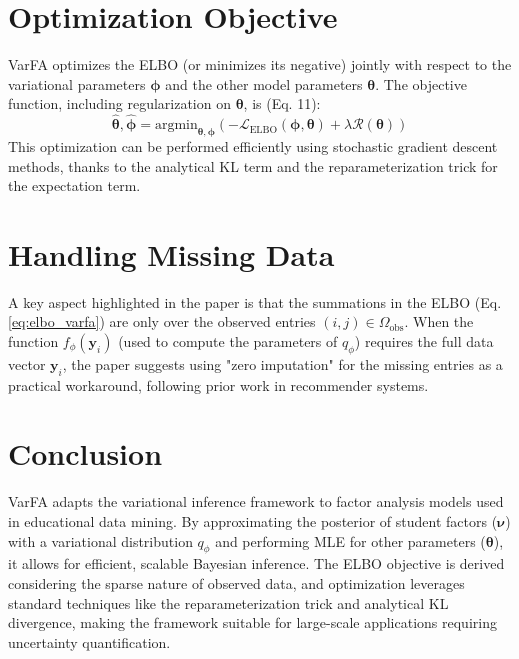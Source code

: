 \documentclass[11pt, letterpaper]{article}
\newcommand{\vy}{\boldsymbol{y}} %
\newcommand{\vnu}{\boldsymbol{\nu}} %
\newcommand{\vtheta}{\boldsymbol{\theta}} %
\newcommand{\vphi}{\boldsymbol{\phi}} %
\newcommand{\Omegaobs}{\Omega_{\text{obs}}} %
\begin{document}
\section{Optimization Objective}

VarFA optimizes the ELBO (or minimizes its negative) jointly with respect to the variational parameters $\vphi$ and the other model parameters $\vtheta$. The objective function, including regularization on $\vtheta$, is (Eq. 11):
\begin{equation}
    \hat{\vtheta}, \hat{\vphi} = \text{argmin}_{\vtheta, \vphi} \left( -\mathcal{L}_{\text{ELBO}}(\vphi, \vtheta) + \lambda \mathcal{R}(\vtheta) \right)
    \label{eq:optimization_obj}
\end{equation}
This optimization can be performed efficiently using stochastic gradient descent methods, thanks to the analytical KL term and the reparameterization trick for the expectation term.

\section{Handling Missing Data}

A key aspect highlighted in the paper is that the summations in the ELBO (Eq. \ref{eq:elbo_varfa}) are only over the observed entries $(i,j) \in \Omegaobs$. When the function $f_{\phi}(\vy_i)$ (used to compute the parameters of $q_{\phi}$) requires the full data vector $\vy_i$, the paper suggests using "zero imputation" for the missing entries as a practical workaround, following prior work in recommender systems.

\section{Conclusion}

VarFA adapts the variational inference framework to factor analysis models used in educational data mining. By approximating the posterior of student factors ($\vnu$) with a variational distribution $q_{\phi}$ and performing MLE for other parameters ($\vtheta$), it allows for efficient, scalable Bayesian inference. The ELBO objective is derived considering the sparse nature of observed data, and optimization leverages standard techniques like the reparameterization trick and analytical KL divergence, making the framework suitable for large-scale applications requiring uncertainty quantification.

\end{document}
